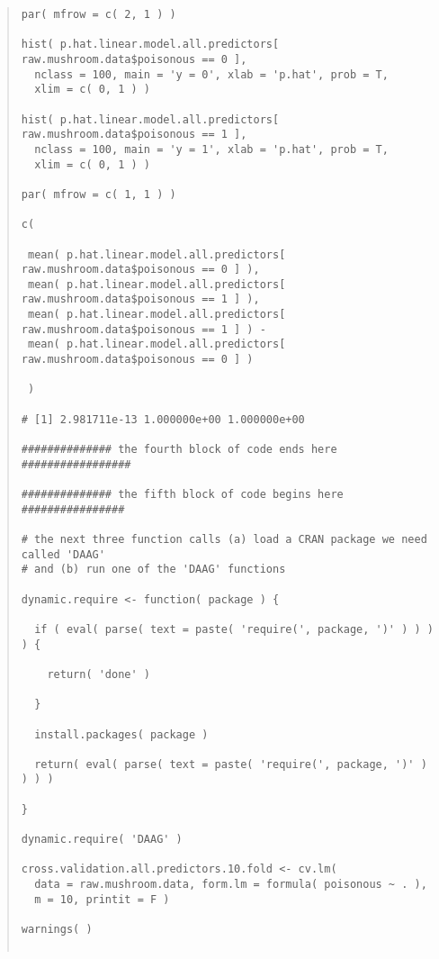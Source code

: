 \documentclass[12pt]{article}
\begin{document}
\begin{quote}
\begin{verbatim}
par( mfrow = c( 2, 1 ) )

hist( p.hat.linear.model.all.predictors[ raw.mushroom.data$poisonous == 0 ],
  nclass = 100, main = 'y = 0', xlab = 'p.hat', prob = T,
  xlim = c( 0, 1 ) )

hist( p.hat.linear.model.all.predictors[ raw.mushroom.data$poisonous == 1 ],
  nclass = 100, main = 'y = 1', xlab = 'p.hat', prob = T,
  xlim = c( 0, 1 ) )

par( mfrow = c( 1, 1 ) )

c( 

 mean( p.hat.linear.model.all.predictors[ raw.mushroom.data$poisonous == 0 ] ),
 mean( p.hat.linear.model.all.predictors[ raw.mushroom.data$poisonous == 1 ] ),
 mean( p.hat.linear.model.all.predictors[ raw.mushroom.data$poisonous == 1 ] ) -
 mean( p.hat.linear.model.all.predictors[ raw.mushroom.data$poisonous == 0 ] )

 )

# [1] 2.981711e-13 1.000000e+00 1.000000e+00

############## the fourth block of code ends here #################

############## the fifth block of code begins here ################

# the next three function calls (a) load a CRAN package we need called 'DAAG'
# and (b) run one of the 'DAAG' functions

dynamic.require <- function( package ) {

  if ( eval( parse( text = paste( 'require(', package, ')' ) ) ) ) {

    return( 'done' )

  }

  install.packages( package )

  return( eval( parse( text = paste( 'require(', package, ')' ) ) ) )

}

dynamic.require( 'DAAG' )

cross.validation.all.predictors.10.fold <- cv.lm( 
  data = raw.mushroom.data, form.lm = formula( poisonous ~ . ), 
  m = 10, printit = F ) 

warnings( )


\end{verbatim}
\end{quote}
\end{document}
